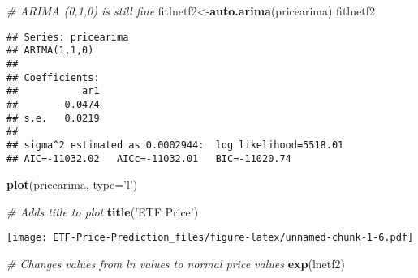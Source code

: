 \documentclass[
]{article}
\newenvironment{Shaded}{\begin{snugshade}}{\end{snugshade}}
\newcommand{\CommentTok}[1]{\textcolor[rgb]{0.56,0.35,0.01}{\textit{#1}}}
\newcommand{\DataTypeTok}[1]{\textcolor[rgb]{0.13,0.29,0.53}{#1}}
\newcommand{\KeywordTok}[1]{\textcolor[rgb]{0.13,0.29,0.53}{\textbf{#1}}}
\newcommand{\NormalTok}[1]{#1}
\newcommand{\StringTok}[1]{\textcolor[rgb]{0.31,0.60,0.02}{#1}}
\begin{document}
\begin{Shaded}
\begin{Highlighting}[]
      \CommentTok{# ARIMA (0,1,0) is still fine}
\NormalTok{        fitlnetf2<-}\KeywordTok{auto.arima}\NormalTok{(pricearima)}
\NormalTok{        fitlnetf2}
\end{Highlighting}
\end{Shaded}

\begin{verbatim}
## Series: pricearima 
## ARIMA(1,1,0) 
## 
## Coefficients:
##           ar1
##       -0.0474
## s.e.   0.0219
## 
## sigma^2 estimated as 0.0002944:  log likelihood=5518.01
## AIC=-11032.02   AICc=-11032.01   BIC=-11020.74
\end{verbatim}

\begin{Shaded}
\begin{Highlighting}[]
        \KeywordTok{plot}\NormalTok{(pricearima, }\DataTypeTok{type=}\StringTok{'l'}\NormalTok{)}
        
      \CommentTok{# Adds title to plot}
        \KeywordTok{title}\NormalTok{(}\StringTok{'ETF Price'}\NormalTok{)}
\end{Highlighting}
\end{Shaded}

\texttt{[image: ETF-Price-Prediction\_files/figure-latex/unnamed-chunk-1-6.pdf]}

\begin{Shaded}
\begin{Highlighting}[]
      \CommentTok{# Changes values from ln values to normal price values}
        \KeywordTok{exp}\NormalTok{(lnetf2)}
\end{Highlighting}
\end{Shaded}
\end{document}
